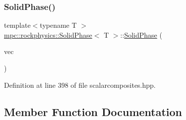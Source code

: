 \subsubsection{\texorpdfstring{Solid\+Phase()}{SolidPhase()}}
{\footnotesize\ttfamily template$<$typename T $>$ \\
\mbox{\hyperlink{classmpc_1_1rockphysics_1_1_solid_phase}{mpc\+::rockphysics\+::\+Solid\+Phase}}$<$ T $>$\+::\mbox{\hyperlink{classmpc_1_1rockphysics_1_1_solid_phase}{Solid\+Phase}} (\begin{DoxyParamCaption}\item[{const std\+::vector$<$ std\+::tuple$<$ \mbox{\hyperlink{structmpc_1_1rockphysics_1_1_bulk_modulus_type}{mpc\+::rockphysics\+::\+Bulk\+Modulus\+Type}}$<$ T $>$, \mbox{\hyperlink{structmpc_1_1rockphysics_1_1_shear_modulus_type}{mpc\+::rockphysics\+::\+Shear\+Modulus\+Type}}$<$ T $>$, \mbox{\hyperlink{structmpc_1_1rockphysics_1_1_density_type}{mpc\+::rockphysics\+::\+Density\+Type}}$<$ T $>$, \mbox{\hyperlink{structmpc_1_1rockphysics_1_1_volume_fraction_type}{mpc\+::rockphysics\+::\+Volume\+Fraction\+Type}}$<$ T $>$ $>$ $>$ \&}]{vec }\end{DoxyParamCaption})\hspace{0.3cm}{\ttfamily [inline]}}



Definition at line 398 of file scalarcomposites.\+hpp.



\subsection{Member Function Documentation}
\mbox{\label{classmpc_1_1rockphysics_1_1_solid_phase_ae8dbd8e5777a51515f84f6fb7e87ba97}} 
